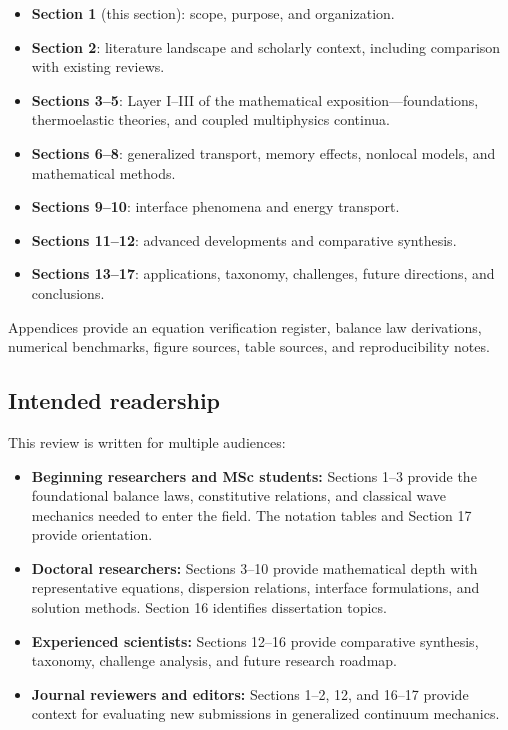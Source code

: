 \begin{itemize}
\item \textbf{Section 1} (this section): scope, purpose, and organization.
\item \textbf{Section 2}: literature landscape and scholarly context, including comparison with existing reviews.
\item \textbf{Sections 3--5}: Layer I--III of the mathematical exposition—foundations, thermoelastic theories, and coupled multiphysics continua.
\item \textbf{Sections 6--8}: generalized transport, memory effects, nonlocal models, and mathematical methods.
\item \textbf{Sections 9--10}: interface phenomena and energy transport.
\item \textbf{Sections 11--12}: advanced developments and comparative synthesis.
\item \textbf{Sections 13--17}: applications, taxonomy, challenges, future directions, and conclusions.
\end{itemize}

Appendices provide an equation verification register, balance law derivations, numerical benchmarks, figure sources, table sources, and reproducibility notes.

\subsection{Intended readership}

This review is written for multiple audiences:

\begin{itemize}
\item \textbf{Beginning researchers and MSc students:} Sections 1--3 provide the foundational balance laws, constitutive relations, and classical wave mechanics needed to enter the field. The notation tables and Section 17 provide orientation.
\item \textbf{Doctoral researchers:} Sections 3--10 provide mathematical depth with representative equations, dispersion relations, interface formulations, and solution methods. Section 16 identifies dissertation topics.
\item \textbf{Experienced scientists:} Sections 12--16 provide comparative synthesis, taxonomy, challenge analysis, and future research roadmap.
\item \textbf{Journal reviewers and editors:} Sections 1--2, 12, and 16--17 provide context for evaluating new submissions in generalized continuum mechanics.
\end{itemize}

